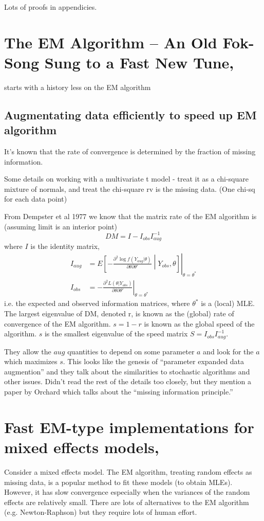\documentclass{article}\usepackage[]{graphicx}\usepackage[]{color}
\begin{document}
Lots of proofs in appendicies.

\section{The EM Algorithm -- An Old Fok-Song Sung to a Fast New Tune, \citet{meng1997algorithm}}
starts with a history less on the EM algorithm
\subsection{Augmentating data efficiently to speed up EM algorithm}
It's known that the rate of convergence is determined by the fraction of missing information.

Some details on working with a multivariate t model - treat it as a chi-square mixture of normals, and treat the chi-square rv is the missing data. (One chi-sq for each data point)

From Dempster et al 1977 we know that the matrix rate of the EM algorithm is (assuming limit is an interior point)
\[
DM = I - I_{obs}I^{-1}_{aug}
\]
where $I$ is the identity matrix,
\begin{align*}
  I_{aug} & = \left.E\left[-\frac{\partial^2\log f(Y_{aug}|\theta)}{\partial\theta\partial\theta'}\middle|Y_{obs},\theta\right]\right|_{\theta=\theta^*}\\
    I_{obs} & = -\left.\frac{\partial^2L(\theta|Y_{obs})}{\partial\theta\partial\theta'}\right\vert_{\theta=\theta^*}
\end{align*}
i.e. the expected and observed information matrices, where $\theta^*$ is a (local) MLE. The largest eigenvalue of DM, denoted r, is known as the (global) rate of convergence of the EM algorithm. $s = 1 - r$ is known as the global speed of the algorithm. $s$ is the smallest eigenvalue of the speed matrix $S=I_{obs}I_{aug}^{-1}$.

They allow the $aug$ quantities to depend on some parameter $a$ and look for the $a$ which maximizes $s$. This looks like the genesis of ``parameter expanded data augmention'' and they talk about the similarities to stochastic algorithms and other issues. Didn't read the rest of the details too closely, but they mention a paper by Orchard which talks about the ``missing information principle.''

\section{Fast EM-type implementations for mixed effects models, \citet{meng1998fast}}
Consider a mixed effects model. The EM algorithm, treating random effects as missing data, is a popular method to fit these models (to obtain MLEs).  However, it has slow convergence especially when the variances of the random effects are relatively small. There are lots of alternatives to the EM algorithm (e.g. Newton-Raphson) but they require lots of human effort.
\end{document}
